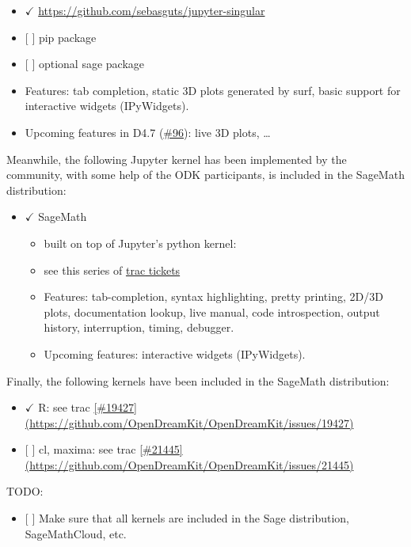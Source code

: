 \begin{itemize}
  \begin{itemize}
  \tightlist
  \item
    \(\checkmark\) \url{https://github.com/sebasguts/jupyter-singular}
  \item
    {[} {]} pip package
  \item
    {[} {]} optional sage package
  \item
    Features: tab completion, static 3D plots generated by surf, basic
    support for interactive widgets (IPyWidgets).
  \item
    Upcoming features in D4.7
    (\href{https://github.com/OpenDreamKit/OpenDreamKit/issues/96}{\#96}):
    live 3D plots, \ldots{}
  \end{itemize}
\end{itemize}

Meanwhile, the following Jupyter kernel has been implemented by the
community, with some help of the ODK participants, is included in the
SageMath distribution:

\begin{itemize}
\tightlist
\item
  \(\checkmark\) SageMath

  \begin{itemize}
  \tightlist
  \item
    built on top of Jupyter's python kernel:
  \item
    see this series of
    \href{https://trac.sagemath.org/query?status=closed\&summary=~Jupyter\&col=id\&col=summary\&col=status\&col=type\&col=priority\&col=milestone\&col=component\&order=priority}{trac
    tickets}
  \item
    Features: tab-completion, syntax highlighting, pretty printing,
    2D/3D plots, documentation lookup, live manual, code introspection,
    output history, interruption, timing, debugger.
  \item
    Upcoming features: interactive widgets (IPyWidgets).
  \end{itemize}
\end{itemize}

Finally, the following kernels have been included in the SageMath
distribution:

\begin{itemize}
\tightlist
\item
  \(\checkmark\) R: see trac
  \href{https://trac.sagemath.org/ticket/19427}{{[}\#19427{]}(https://github.com/OpenDreamKit/OpenDreamKit/issues/19427)}
\item
  {[} {]} cl, maxima: see trac
  \href{https://trac.sagemath.org/ticket/21445}{{[}\#21445{]}(https://github.com/OpenDreamKit/OpenDreamKit/issues/21445)}
\end{itemize}

TODO:

\begin{itemize}
\tightlist
\item
  {[} {]} Make sure that all kernels are included in the Sage
  distribution, SageMathCloud, etc.
\end{itemize}
